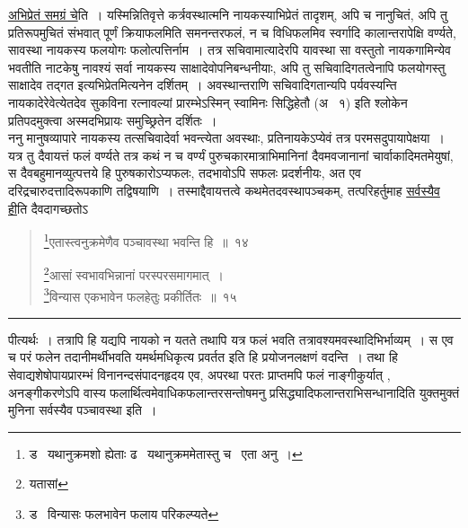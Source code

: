 \documentclass[11pt, openany]{book}
\begin{document}
\underline{अभिप्रेतं समग्रं चे}ति~। यस्मिन्नितिवृत्ते कर्त्रवस्थात्मनि नायकस्याभिप्रेतं तादृशम्, अपि च नानुचितं, अपि तु प्रतिरूपमुचितं संभवात् पूर्णं {\qt क्रियाफल}मिति समनन्तरफलं, न च विधिफलमिव स्वर्गादि कालान्तरापेक्षि वर्ण्यते, सावस्था नायकस्य फलयोगः फलोत्पत्तिर्नाम~। तत्र सचिवामात्यादेरपि यावस्था सा वस्तुतो नायकगामिन्येव भवतीति नाटकेषु नावश्यं सर्वा नायकस्य साक्षादेवोपनिबन्धनीयाः, अपि तु सचिवादिगतत्वेनापि फलयोगस्तु साक्षादेव तद्गत इत्यभिप्रेतमित्यनेन दर्शितम्~। अवस्थान्तराणि सचिवादिगतान्यपि पर्यवस्यन्ति नायकादेरेवेत्येतदेव सुकविना रत्नावल्यां {\qt प्रारम्भेऽस्मिन् स्वामिनः सिद्धिहेतौ} (अ \textendash\ १) इति श्लोकेन प्रतिपदमुक्त्वा अस्मदभिप्रायः समुच्छ्रितेन दर्शितः~।\\

ननु मानुषव्यापारे नायकस्य तत्सचिवादेर्वा भवन्त्येता अवस्थाः, प्रतिनायकेऽप्येवं तत्र परमसदुपायापेक्षया~। यत्र तु दैवायत्तं फलं वर्ण्यते तत्र कथं न च वर्ण्यं पुरुचकारमात्राभिमानिनां दैवमवजानानां चार्वाकादिमतमेयुषां, स दैवबहुमानव्युत्पत्तये हि पुरुषकारोऽप्यफलः, तदभावोऽपि सफलः प्रदर्शनीयः, अत एव दरिद्रचारुदत्तादिरूपकाणि तद्विषयाणि~। तस्माद्दैवायत्तत्वे कथमेतदवस्थापञ्चकम्, तत्परिहर्तुमाह \underline{सर्वस्यैव ही}ति दैवदागच्छतोऽ \textendash

\newpage

\begin{quote}
{\na \renewcommand{\thefootnote}{1}\footnote{ड \textendash\ यथानुक्रमशो ह्येताः ढ \textendash\ यथानुक्रममेतास्तु च \textendash\ एता अनु~।}एतास्त्वनुक्रमेणैव पञ्चावस्था भवन्ति हि~॥~१४

\renewcommand{\thefootnote}{2}\footnote{यतासां}आसां स्वभावभिन्नानां परस्परसमागमात्~।\\
\renewcommand{\thefootnote}{3}\footnote{ड \textendash\ विन्यासः फलभावेन फलाय परिकल्प्यते}विन्यास एकभावेन फलहेतुः प्रकीर्तितः~॥~१५}
\end{quote}

\hrule

\vspace{2mm}
\noindent
पीत्यर्थः~। तत्रापि हि यद्यपि नायको न यतते तथापि यत्र फलं भवति तत्रावश्यमवस्थादिभिर्भाव्यम्~। स एव च परं फलेन तदानीमर्थीभवति {\qt यमर्थमधिकृत्य प्रवर्तत} इति हि प्रयोजनलक्षणं वदन्ति~। तथा हि सेवाद्यशेषोपायप्रारम्भं विनानन्दसंपादनहृदय एव, अपरथा परतः प्राप्तमपि फलं नाङ्गीकुर्यात् , अनङ्गीकरणेऽपि वास्य फलार्थित्वमेवाधिकफलान्तरसन्तोषमनु प्रसिद्ध्यादिफलान्तराभिसन्धानादिति युक्तमुक्तं मुनिना सर्वस्यैव पञ्चावस्था इति~।\\
\end{document}
